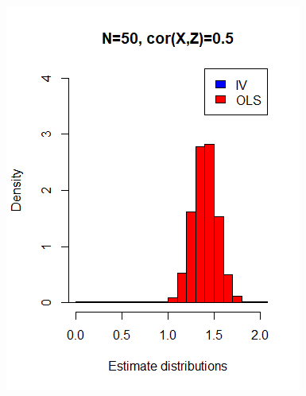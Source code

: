 \documentclass[a4paper,12pt,oneside,English]{article}
\begin{document}
\begin{figure}[p!]
    \begin{minipage}[b]{0.5\linewidth}
        \includegraphics[width=\linewidth]{Fig1.png}
    \end{minipage}
    \begin{minipage}[b]{0.5\linewidth}

\end{minipage}
\end{figure}
\end{document}
